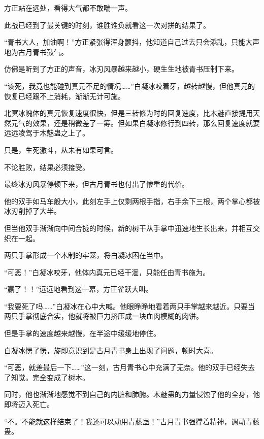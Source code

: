 
\begin{this_body}



方正站在远处，看得大气都不敢喘一声。

此战已经到了最关键的时刻，谁胜谁负就看这一次对拼的结果了。

“青书大人，加油啊！”方正紧张得浑身颤抖，他知道自己过去只会添乱，只能大声地为古月青书鼓气。

仿佛是听到了方正的声音，冰刃风暴越来越小，硬生生地被青书压制下来。

“该死，我竟也能碰到真元不足的情况……”白凝冰咬着牙，越转越慢，但他真元的恢复已经跟不上消耗，渐渐无计可施。

北冥冰魄体的真元恢复速度很快，但是三转修为时的回复速度，比木魅直接提用天然元气的效果，还是稍微差了一筹。但如果白凝冰修行到四转，那么回复速度就要远远凌驾于木魅蛊之上了。

只是，生死激斗，从未有如果可言。

不论胜败，结果必须接受。

最终冰刃风暴停顿下来，但古月青书也付出了惨重的代价。

他的双手如马车般大小，此刻左手上仅剩两根手指，右手余下三根，两个掌心都被冰刃削掉了大半。

但当他双手渐渐向中间合拢的时候，新的树干从手掌中迅速地生长出来，并相互交织在一起。

两只手掌形成一个木制的牢笼，将白凝冰困在当中。

“可恶！”白凝冰咬牙，他体内真元已经干涸，只能任由青书施为。

“赢了！！”远远地看到这一幕，方正雀跃大叫。

“我要死了吗……”白凝冰在心中大喊。他眼睁睁地看着两只手掌越来越近。只要当两只手掌彻底合实，他就将被巨力挤压成一块血肉模糊的肉饼。

但是手掌的速度越来越慢，在半途中缓缓地停住。

白凝冰愣了愣，旋即意识到是古月青书身上出现了问题，顿时大喜。

“可恶，就差最后一下……”这一刻，古月青书心中充满了无奈。他的双手已经失去了知觉。完全变成了树木。

同时，他也渐渐地感觉不到自己的内脏和肺腑。木魅蛊的力量侵蚀了他的全身，他即将迈入死亡。

“不。不能就这样结束了！我还可以动用青藤蛊！”古月青书强撑着精神，调动青藤蛊。


\end{this_body}
